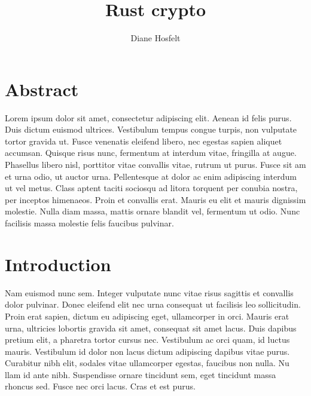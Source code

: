 \documentclass[10pt]{article}
\title{Rust crypto}
\author{Diane Hosfelt}
\begin{document}

\maketitle
\begin{multicols*}{2}
\thispagestyle{fancyplain}\pagestyle{fancy}		%


\section*{Abstract}
Lorem ipsum dolor sit amet, consectetur adipiscing elit. Aenean id felis purus. Duis dictum euismod ultrices. Vestibulum tempus congue turpis, non vulputate tortor gravida ut. Fusce venenatis eleifend libero, nec egestas sapien aliquet accumsan. Quisque risus nunc, fermentum at interdum vitae, fringilla at augue. Phasellus libero nisl, porttitor vitae convallis vitae, rutrum ut purus. Fusce sit am
et urna odio, ut auctor urna. Pellentesque at dolor ac enim adipiscing interdum
ut vel metus. Class aptent taciti sociosqu ad litora torquent per conubia nostra, per inceptos himenaeos. Proin et convallis erat. Mauris eu elit et mauris dignissim molestie. Nulla diam massa, mattis ornare blandit vel, fermentum ut odio. Nunc facilisis massa molestie felis faucibus pulvinar.

\audiencesec
{}\stop

\section{Introduction}
Nam euismod nunc sem. Integer vulputate nunc vitae risus sagittis et convallis dolor pulvinar. Donec eleifend elit nec urna consequat ut facilisis leo sollicitudin. Proin erat sapien, dictum eu adipiscing eget, ullamcorper in orci. Mauris erat urna, ultricies lobortis gravida sit amet, consequat sit amet lacus. Duis dapibus pretium elit, a pharetra tortor cursus nec. Vestibulum ac orci quam, id luctus mauris. Vestibulum id dolor non lacus dictum adipiscing dapibus vitae purus. Curabitur nibh elit, sodales vitae ullamcorper egestas, faucibus non nulla. Nu
llam id ante nibh. Suspendisse ornare tincidunt sem, eget tincidunt massa rhoncus sed. Fusce nec orci lacus. Cras et est purus.


\end{multicols*}
\end{document}
